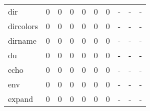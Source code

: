 \begin{longtable}{lp{1.3cm}p{1.3cm}p{1.3cm}p{1.3cm}p{1.3cm}p{1.3cm}p{1.3cm}p{1.3cm}p{1.3cm}}
dir       &                      0 &                                             0 &                                            0 &                                           0 &                                            0 &                                          0 &                                    - &                                      - &                                    - \\
dircolors &                      0 &                                             0 &                                            0 &                                           0 &                                            0 &                                          0 &                                    - &                                      - &                                    - \\
dirname   &                      0 &                                             0 &                                            0 &                                           0 &                                            0 &                                          0 &                                    - &                                      - &                                    - \\
du        &                      0 &                                             0 &                                            0 &                                           0 &                                            0 &                                          0 &                                    - &                                      - &                                    - \\
echo      &                      0 &                                             0 &                                            0 &                                           0 &                                            0 &                                          0 &                                    - &                                      - &                                    - \\
env       &                      0 &                                             0 &                                            0 &                                           0 &                                            0 &                                          0 &                                    - &                                      - &                                    - \\
expand    &                      0 &                                             0 &                                            0 &                                           0 &                                            0 &                                          0 &                                    - &                                      - &                                    - \\

\end{longtable}
